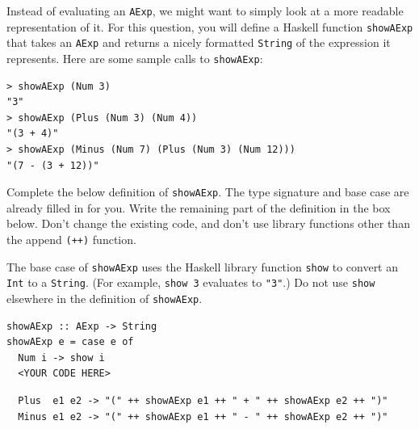 \documentclass[addpoints]{exam}
\begin{document}
\begin{questions}
\newpage

\question[10] Instead of evaluating an \texttt{AExp}, we might want to simply look at a more readable representation of it.  For this question, you will define a Haskell function \texttt{showAExp} that takes an \texttt{AExp} and returns a nicely formatted \texttt{String} of the expression it represents.  Here are some sample calls to \texttt{showAExp}:

\begin{verbatim}
> showAExp (Num 3)
"3"
> showAExp (Plus (Num 3) (Num 4))
"(3 + 4)"
> showAExp (Minus (Num 7) (Plus (Num 3) (Num 12)))
"(7 - (3 + 12))"
\end{verbatim}

Complete the below definition of \texttt{showAExp}.  The type signature and base case are already filled in for you.  Write the remaining part of the definition in the box below.  Don't change the existing code, and don't use library functions other than the append \texttt{(++)} function.

The base case of \texttt{showAExp} uses the Haskell library function \texttt{show} to convert an \texttt{Int} to a \texttt{String}.  (For example, \texttt{show 3} evaluates to \texttt{"3"}.)  Do not use \texttt{show} elsewhere in the definition of \texttt{showAExp}.

\begin{verbatim}
showAExp :: AExp -> String
showAExp e = case e of
  Num i -> show i
  <YOUR CODE HERE>
\end{verbatim}
\begin{solutionorbox}[2in]
\begin{footnotesize}
\begin{verbatim}
  Plus  e1 e2 -> "(" ++ showAExp e1 ++ " + " ++ showAExp e2 ++ ")"
  Minus e1 e2 -> "(" ++ showAExp e1 ++ " - " ++ showAExp e2 ++ ")"
\end{verbatim}
\end{footnotesize}
\end{solutionorbox}

\end{questions}
\end{document}
